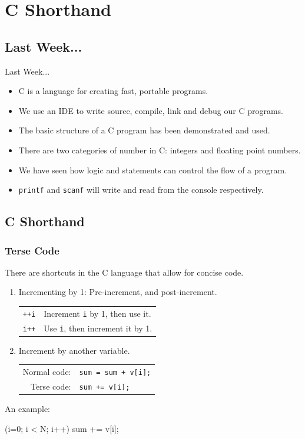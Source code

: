 \documentclass[smaller,handout,table]{beamer}
\subtitle{Lecture 2 of 5}
\begin{document}
{
\begin{frame}
  \titlepage
\end{frame}
}

\section{C Shorthand}
\subsection{Last Week...}
\begin{frame}{Last Week...}
\begin{itemize}
\item C is a language for creating fast, portable programs.
\item We use an IDE to write source, compile, link and debug our C programs.
\item The basic structure of a C program has been demonstrated and used.
\item There are two categories of number in C: integers and floating point numbers.
\item We have seen how logic and statements can control the flow of a program.
\item \texttt{printf} and \texttt{scanf} will write and read from the console respectively.
\end{itemize}
\end{frame}


\subsection{C Shorthand}
\begin{frame}[fragile]
\frametitle{Terse Code}
There are shortcuts in the C language that allow for concise code.
\begin{enumerate}
\item Incrementing by 1: Pre-increment, and post-increment.\\
\begin{tabular}{l l}
\tt ++i& Increment {\tt i} by 1, then use it.\\
\tt i++& Use {\tt i}, then increment it by 1.
\end{tabular}
\item Increment by another variable.\\
\begin{tabular}{r l}
Normal code:&\tt sum = sum + v[i];\\
Terse code:&\tt sum += v[i];
\end{tabular}
\end{enumerate}
An example:\\
\begin{semiverbatim}
    (i=0; i < N; i++)
      sum += v[i];
\end{semiverbatim}
\end{frame}
\end{document}

